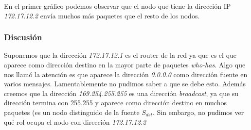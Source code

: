 En el primer gráfico podemos observar que el nodo que tiene la dirección IP \emph{172.17.12.2} envía muchos más paquetes que el resto de los nodos. 

\subsubsection{Discusión}

Suponemos que la dirección \emph{172.17.12.1} es el router de la red ya que es el que aparece como dirección destino en la mayor parte de paquetes \emph{who-has}. Algo que nos llamó la atención es que aparece la dirección \emph{0.0.0.0} como dirección fuente en varios mensajes. Lamentablemente no pudimos saber a que se debe esto.
Además creemos que la dirección \emph{169.254.255.255} es una dirección \emph{broadcast}, ya que su dirección termina con 255.255 y aparece como dirección destino en muchos paquetes (es un nodo distinguido de la fuente $S_{dst}$.
Sin embargo, no pudimos ver qué rol ocupa el nodo con dirección \emph{172.17.12.2}

% 
% 
% 
